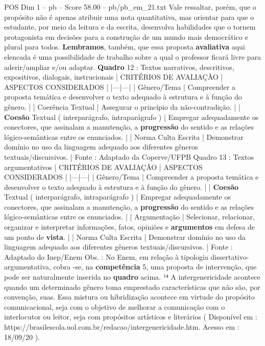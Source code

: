 \begin{textsample}{POS Dim 1 – pb – Score 58.00 – pb/pb\_em\_21.txt}
Vale ressaltar, porém, que o propósito não é apenas atribuir uma nota quantitativa, mas orientar para que o estudante, por meio da leitura e da escrita, desenvolva habilidades que o tornem protagonista em decisões para a construção de um mundo mais democrático e plural para todos. \textbf{Lembramos}, também, que essa proposta \textbf{avaliativa} aqui elencada é uma possibilidade de trabalho sobre a qual o professor ficará livre para aderir/ampliar e/ou adaptar. \textbf{Quadro} 12 : Textos narrativos, descritivos, expositivos, dialogais, instrucionais | CRITÉRIOS DE AVALIAÇÃO | ASPECTOS CONSIDERADOS | |---|---| | Gênero/Tema | Compreender a proposta temática e desenvolver o texto adequado à estrutura e à função do gênero. | | Coerência Textual | Assegurar o princípio da não-contradição. | | \textbf{Coesão} Textual ( interparágrafo, intraparágrafo ) | Empregar adequadamente os conectores, que assinalam a manutenção, a \textbf{progressão} do sentido e as relações lógico-semânticas entre os enunciados. | | Norma Culta Escrita | Demonstrar domínio no uso da linguagem adequado aos diferentes gêneros textuais/discursivos. | Fonte : Adaptado da Coperve/UFPB Quadro 13 : Textos argumentativos | CRITÉRIOS DE AVALIAÇÃO | ASPECTOS CONSIDERADOS | |---|---| | Gênero/Tema | Compreender a proposta temática e desenvolver o texto adequado à estrutura e à função do gênero. | | \textbf{Coesão} Textual ( interparágrafo, intraparágrafo ) | Empregar adequadamente os conectores, que assinalam a manutenção, a \textbf{progressão} do sentido e as relações lógico-semânticas entre os enunciados. | | Argumentação | Selecionar, relacionar, organizar e interpretar informações, fatos, opiniões e \textbf{argumentos} em defesa de um ponto de \textbf{vista}. | | Norma Culta Escrita | Demonstrar domínio no uso da linguagem adequado aos diferentes gêneros textuais/discursivos. | Fonte : Adaptado do Inep/Enem Obs. : No Enem, em relação à tipologia dissertativo-argumentativa, cobra -se, na \textbf{competência} 5, uma proposta de intervenção, que pode ser naturalmente inserida no \textbf{quadro} acima. ¹⁴ A intergenericidade acontece quando um determinado gênero toma emprestado características que não são, por convenção, suas.
Essa mistura ou hibridização acontece em virtude do propósito comunicacional, seja com o objetivo de melhorar a comunicação com o interlocutor ou leitor, seja com propósitos artísticos e literários ( Disponível em : https://brasilescola.uol.com.br/redacao/intergenericidade.htm.
Acesso em : 18/09/20 ).

\end{textsample}
